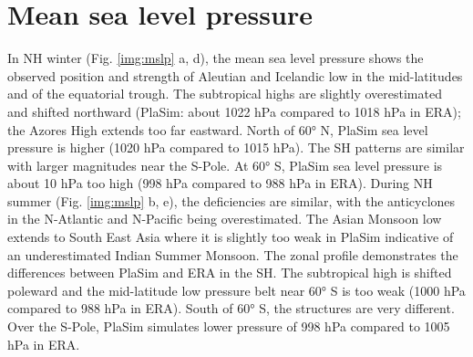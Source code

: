 \documentclass[12pt,a4paper,twoside,openright,headinclude,liststotoc,bibtotoc]{scrreprt}
\begin{document}
\vspace{-0.4cm}
\section{Mean sea level pressure}
\vspace{-0.4cm}


In NH winter (Fig. \ref{img:mslp} a, d), the mean sea level pressure shows the observed position and strength of Aleutian and Icelandic low in the mid-latitudes and of the equatorial trough. The subtropical highs are slightly overestimated and shifted northward (PlaSim: about 1022 hPa compared to 1018 hPa in ERA); the Azores High extends too far eastward. North of 60° N, PlaSim sea level pressure is higher (1020 hPa compared to 1015 hPa). The SH patterns are similar with larger magnitudes near the S-Pole.
At 60° S, PlaSim sea level pressure is about 10 hPa too high (998 hPa compared to 988 hPa in ERA). During NH summer (Fig. \ref{img:mslp} b, e), the deficiencies are similar, with the anticyclones in the N-Atlantic and N-Pacific being overestimated. The Asian Monsoon low extends to South East Asia where it is slightly too weak in PlaSim indicative of an underestimated Indian Summer Monsoon. The zonal profile demonstrates the differences between PlaSim and ERA in the SH. The subtropical high is shifted poleward and the mid-latitude low pressure belt near 60° S is too weak (1000 hPa compared to 988 hPa in ERA). South of 60° S, the structures are very different. Over the S-Pole, PlaSim simulates lower pressure of 998 hPa compared to 1005 hPa in ERA.
\end{document}

